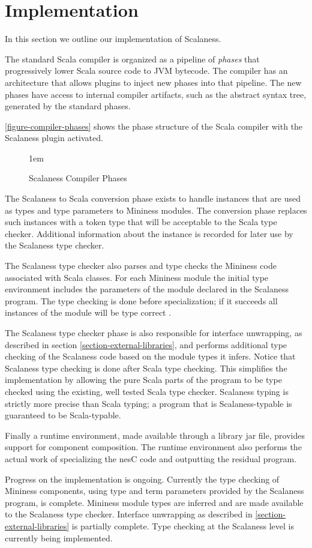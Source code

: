
\section{Implementation}
\label{section-implementation}

In this section we outline our implementation of Scalaness.

The standard Scala compiler is organized as a pipeline of
\textit{phases} that progressively lower Scala source code to JVM
bytecode. The compiler has an architecture that allows plugins to
inject new phases into that pipeline. The new phases have access to
internal compiler artifacts, such as the abstract syntax tree,
generated by the standard phases.

\autoref{figure-compiler-phases} shows the phase structure of the
Scala compiler with the Scalaness plugin activated.

\begin{figure}[htbp]
  
  \centerline{\raise 1em\box\graph}
  \caption{Scalaness Compiler Phases}
  \label{figure-compiler-phases}
\end{figure}

The Scalaness to Scala conversion phase exists to handle
 instances that are used as types and type parameters to
Mininess modules. The conversion phase replaces such instances with a
token type that will be acceptable to the Scala type checker.
Additional information about the  instance is recorded
for later use by the Scalaness type checker.

The Scalaness type checker also parses and type checks the Mininess
code associated with Scala  classes. For each
Mininess module the initial type environment includes the parameters
of the module declared in the Scalaness program. The type checking is
done before specialization; if it succeeds all instances of the module
will be type correct \cite{FramedML}.

The Scalaness type checker phase is also responsible for interface
unwrapping, as described in section
\autoref{section-external-libraries}, and performs additional type
checking of the Scalaness code based on the module types it infers.
Notice that Scalaness type checking is done after Scala type checking.
This simplifies the implementation by allowing the pure Scala parts of
the program to be type checked using the existing, well tested Scala
type checker. Scalaness typing is strictly more precise than Scala
typing; a program that is Scalaness-typable is guaranteed to be
Scala-typable.

Finally a runtime environment, made available through a library jar
file, provides support for component composition. The runtime
environment also performs the actual work of specializing the nesC
code and outputting the residual program.

Progress on the implementation is ongoing. Currently the type checking
of Mininess components, using type and term parameters provided by the
Scalaness program, is complete. Mininess module types are inferred and
are made available to the Scalaness type checker. Interface unwrapping
as described in \autoref{section-external-libraries} is partially
complete. Type checking at the Scalaness level is currently being 
implemented.
